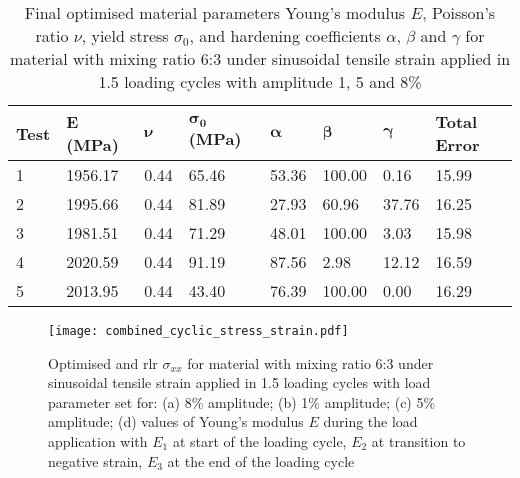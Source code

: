 \begin{table}[h!]
\centering
\caption{Final optimised material parameters Young's modulus $E$, Poisson's ratio $\nu$, yield stress $\sigma_0$, and hardening coefficients $\alpha$, $\beta$ and $\gamma$ for material with mixing ratio 6:3 under sinusoidal tensile strain applied in 1.5 loading cycles with amplitude 1, 5 and 8\%}
\label{tab:cyclicMatParams}
\renewcommand{\arraystretch}{1.1}
\begin{tabular}{L{0.08\textwidth}|C{0.08\textwidth}C{0.08\textwidth}C{0.08\textwidth}C{0.08\textwidth}C{0.08\textwidth}C{0.08\textwidth}C{0.08\textwidth}}
\toprule
\textbf{Test} & \textbf{E (MPa)} & $\boldsymbol{\nu}$ & $\boldsymbol{\sigma_0}$ \textbf{(MPa)} & $\boldsymbol{\alpha}$ & $\boldsymbol{\beta}$ & $\boldsymbol{\gamma}$ & \textbf{Total Error}\\
 & 1956.17 & 0.44 & 65.46 & 53.36 & 100.00 & 0.16 & 15.99\\
2 & 1995.66 & 0.44 & 81.89 & 27.93 & 60.96 & 37.76 & 16.25\\
3 & 1981.51 & 0.44 & 71.29 & 48.01 & 100.00 & 3.03 & 15.98\\
4 & 2020.59 & 0.44 & 91.19 & 87.56 & 2.98 & 12.12 & 16.59\\
5 & 2013.95 & 0.44 & 43.40 & 76.39 & 100.00 & 0.00 & 16.29\\
\bottomrule
\end{tabular}
\end{table}


\begin{figure}[H]
    \centering
    \texttt{[image: combined\_cyclic\_stress\_strain.pdf]}
    \caption{Optimised and \acrfull{rlr} $\sigma_{xx}$ for material with mixing ratio 6:3 under sinusoidal tensile strain applied in 1.5 loading cycles with load parameter set for: (a) 8\% amplitude; (b) 1\% amplitude; (c) 5\% amplitude; (d) values of Young's modulus $E$ during the load application with $E_1$ at start of the loading cycle, $E_2$ at transition to negative strain, $E_3$ at the end of the loading cycle}
    \label{fig:cycliclStressStrain}
\end{figure}
 
